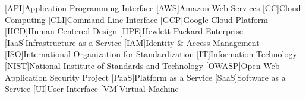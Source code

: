 \begin{acronym}[TTTTTTTT]
	[API]{Application Programming Interface}
	[AWS]{Amazon Web Services}
	[CC]{Cloud Computing}
	[CLI]{Command Line Interface}
	[GCP]{Google Cloud Platform}
	[HCD]{Human-Centered Design}
	[HPE]{Hewlett Packard Enterprise}
	[IaaS]{Infrastructure as a Service}
	[IAM]{Identity \& Access Management}
	[ISO]{International Organization for Standardization}
	[IT]{Information Technology}
	[NIST]{National Institute of Standards and Technology}
	[OWASP]{Open Web Application Security Project}
	[PaaS]{Platform as a Service}
	[SaaS]{Software as a Service}
	[UI]{User Interface}
	[VM]{Virtual Machine}
\end{acronym}
